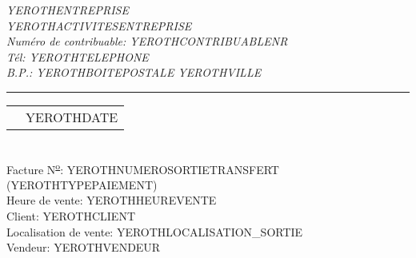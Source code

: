 \documentclass[1.75pt]{article} %
\makeatletter
\newcommand{\headerrow}[2]
{\begin{tabular*}{\linewidth}{l@{\extracolsep{\fill}}r}
	#1 &
	#2 \\
\end{tabular*}}
\makeatother
\begin{document}
\emph{YEROTHENTREPRISE} \\
\emph{YEROTHACTIVITESENTREPRISE} \\
\emph{Num\'ero de contribuable: YEROTHCONTRIBUABLENR} \\
\emph{T\'el: YEROTHTELEPHONE} \\
\emph{B.P.: YEROTHBOITEPOSTALE YEROTHVILLE}

\vspace*{0.2cm}

\hrule

\headerrow
{}
{YEROTHDATE}\\

Facture N\textsuperscript{\underline{o}}: YEROTHNUMEROSORTIETRANSFERT (YEROTHTYPEPAIEMENT)\\
Heure de vente: YEROTHHEUREVENTE\\
Client: YEROTHCLIENT\\
Localisation de vente: YEROTHLOCALISATION_SORTIE\\
Vendeur: YEROTHVENDEUR
\vspace*{0.2cm}

\end{document}
